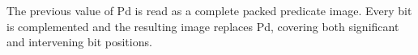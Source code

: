The previous value of Pd is read as a complete packed predicate image.  Every
bit is complemented and the resulting image replaces Pd, covering both
significant and intervening bit positions.
